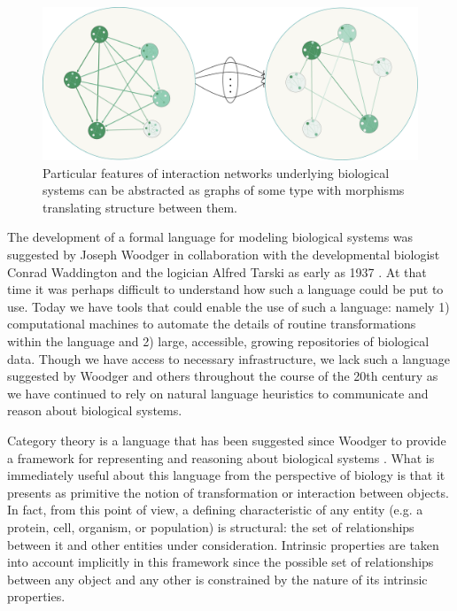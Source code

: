 \documentclass[aps,twocolumn]{revtex4-1}
\begin{document}
\begin{figure}
\noindent\includegraphics[width=1.8\columnwidth]{fig/biograph.pdf}
\caption{Particular features of interaction networks underlying biological systems can be abstracted as graphs of some type with morphisms translating structure between them.}
\label{fig:biograph}
\end{figure}

The development of a formal language for modeling biological systems was suggested by Joseph Woodger in collaboration with the developmental biologist Conrad Waddington and the logician Alfred Tarski as early as 1937 \cite{Woodger1937,Woodger1951,Woodger1952,Woodger1952a}. At that time it was perhaps difficult to understand how such a language could be put to use. Today we have tools that could enable the use of such a language: namely 1) computational machines to automate the details of routine transformations within the language and 2) large, accessible, growing repositories of biological data. Though we have access to necessary infrastructure, we lack such a language suggested by Woodger and others throughout the course of the 20th century as we have continued to rely on natural language heuristics to communicate and reason about biological systems.

Category theory \cite{Lane1985,Lane1998,MacLane1992,Lawvere1997,Lawvere2003,Awodey2006} is a language that has been suggested since Woodger to provide a framework for representing and reasoning about biological systems \cite{GOGUEN1979,Ehresmann2007,Louie2009}. What is immediately useful about this language from the perspective of biology is that it presents as primitive the notion of transformation or interaction between objects. In fact, from this point of view, a defining characteristic of any entity (e.g. a protein, cell, organism, or population) is structural: the set of relationships between it and other entities under consideration. Intrinsic properties are taken into account implicitly in this framework since the possible set of relationships between any object and any other is constrained by the nature of its intrinsic properties. 
\end{document}
